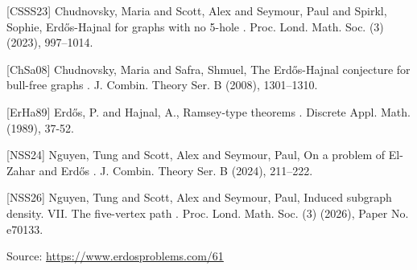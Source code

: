 \documentclass{article}
\begin{document}
[CSSS23] Chudnovsky, Maria and Scott, Alex and Seymour, Paul and Spirkl, Sophie, Erd\H{o}s-{H}ajnal for graphs with no 5-hole . Proc. Lond. Math. Soc. (3) (2023), 997--1014.

[ChSa08] Chudnovsky, Maria and Safra, Shmuel, The {E}rd\H os-{H}ajnal conjecture for bull-free graphs . J. Combin. Theory Ser. B (2008), 1301--1310.

[ErHa89] Erd\H{o}s, P. and Hajnal, A., Ramsey-type theorems . Discrete Appl. Math. (1989), 37-52.

[NSS24] Nguyen, Tung and Scott, Alex and Seymour, Paul, On a problem of {E}l-{Z}ahar and {E}rd\H{o}s . J. Combin. Theory Ser. B (2024), 211--222.

[NSS26] Nguyen, Tung and Scott, Alex and Seymour, Paul, Induced subgraph density. {VII}. The five-vertex path . Proc. Lond. Math. Soc. (3) (2026), Paper No. e70133.


\bigskip
\noindent\small{Source: \url{https://www.erdosproblems.com/61}}
\end{document}
